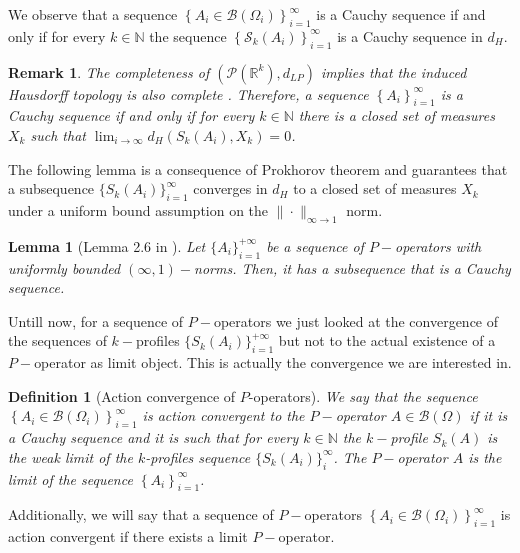 \documentclass[11pt]{article}
\newtheorem{lemma}[theorem]{Lemma}
\newtheorem{definition}[theorem]{Definition}
\newtheorem{remark}[theorem]{Remark}
\def\N{\mathbb{N}}
\begin{document}
We observe that a sequence $\left\{A_i \in \mathcal{B}\left(\Omega_i\right)\right\}_{i=1}^{\infty}$ is a Cauchy sequence  if and only if for every $k \in \mathbb{N}$ the sequence $\left\{\mathcal{S}_k\left(A_i\right)\right\}_{i=1}^{\infty}$ is a Cauchy sequence in $d_H$.
 

\begin{remark} The completeness of $\left(\mathcal{P}\left(\mathbb{R}^k\right), d_{L P}\right)$ implies that the induced Hausdorff topology is also complete \cite{RealAnalysisGordon}. Therefore, a sequence $\left\{A_i\right\}_{i=1}^{\infty}$ is a Cauchy sequence if and only if for every $k \in \mathbb{N}$ there is a closed set of measures $X_k$ such that $\lim _{i \rightarrow \infty} d_H\left(S_k\left(A_i\right), X_k\right)=0$.
 \end{remark}
 
The following lemma is a consequence of Prokhorov theorem and guarantees that a subsequence $\{{S_k\left(A_i\right)}\}^{\infty}_{i=1}$ converges in $d_H$ to a closed set of measures $X_k$ under a uniform bound assumption on the $\|\cdot\|_{\infty\rightarrow 1}$ norm.

\begin{lemma}[Lemma 2.6 in \cite{backhausz2018action}]
Let $\{A_i\}^{+\infty}_{i=1}$ be a sequence of $P-$operators with uniformly bounded $(\infty,1)-$norms. Then, it has a subsequence that is a Cauchy sequence.
\end{lemma}

Untill now, for a sequence of $P-$operators we just looked at the convergence of the sequences of $k-$profiles $\{S_k(A_i)\}^{+\infty}_{i=1}$ but not to the actual existence of a $P-$operator as limit object. This is actually the convergence we are interested in.

\begin{definition}[Action convergence of $P$-operators] 
We say that the sequence  $\left\{A_i \in \mathcal{B}\left(\Omega_i\right)\right\}_{i=1}^{\infty}$ is \emph{action convergent} to the $P-$operator $A\in\mathcal{B}\left(\Omega\right)$  if it is a Cauchy sequence and it is such that for every $k\in \N$ the $k-$profile $S_k(A)$ is the weak limit of the $k$-profiles sequence $\{S_k(A_i)\}^{\infty}_{i}$. The $P-$operator $A$ is the limit of the sequence  $\left\{A_i \right\}_{i=1}^{\infty}$.
\end{definition}

Additionally, we will say that a sequence of $P-$operators $\left\{A_i \in \mathcal{B}\left(\Omega_i\right)\right\}_{i=1}^{\infty}$ is action convergent if there exists a limit $P-$operator.
\end{document}
